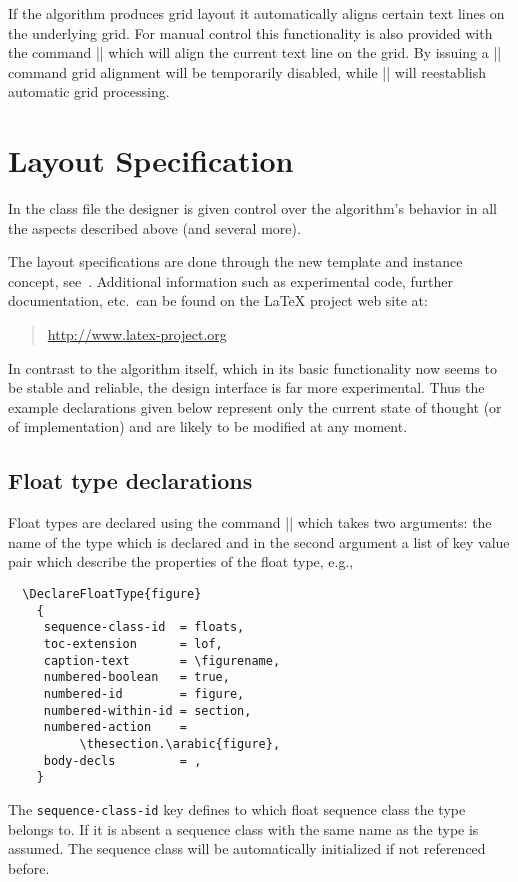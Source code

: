 \documentclass[twocolumn]{article}
\begin{document}
If the algorithm produces grid layout it automatically aligns certain
text lines on the underlying grid. For manual control this
functionality is also provided with the command |\TextAlignGrid| which
will align the current text line on the grid. By issuing a
|\IgnoreAlignToGrid| command grid alignment will be temporarily
disabled, while |\ObeyAlignToGrid| will reestablish automatic grid
processing.


\section{Layout Specification}

In the class file the designer is given control over the algorithm's
behavior in all the aspects described above (and several more). 

The layout specifications are done through the new template and
instance concept, see~\cite{tub:MCR99-3}. 
Additional information such as experimental code, further
documentation, etc.\ can
be found on the \LaTeX{} project web site at:
\begin{quote}
\url{http://www.latex-project.org}
\end{quote}

In contrast to the algorithm itself, which in its basic functionality
now seems to be stable and reliable, the design interface is far
more experimental. Thus the example declarations given below represent
only the current state of thought (or of implementation) 
and are likely to be modified at any moment.


\subsection{Float type declarations}

Float types are declared using the  command |\DeclareFloatType| which
takes two arguments: the name of the type which is declared and in the
second argument a list of key value pair which describe the
properties of the float type, e.g.,
\begin{verbatim}
  \DeclareFloatType{figure}
    {
     sequence-class-id  = floats,
     toc-extension      = lof,
     caption-text       = \figurename,
     numbered-boolean   = true,
     numbered-id        = figure,
     numbered-within-id = section,
     numbered-action    = 
          \thesection.\arabic{figure},
     body-decls         = ,
    }
\end{verbatim}
The \texttt{sequence-class-id} key defines to which float sequence
class the type belongs to. If it is absent a sequence class with the
same name as the type is assumed. The sequence class will be
automatically initialized if not referenced before.
\end{document}
